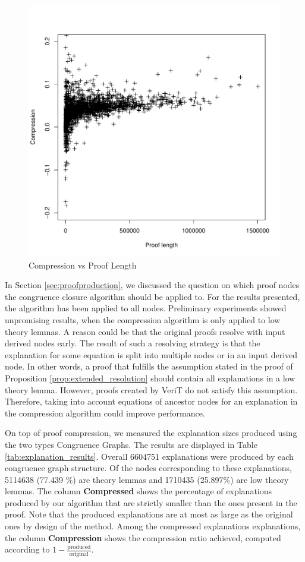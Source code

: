 \begin{figure}[h]
	\centering
	\includegraphics[scale=0.8]{figures/compression_vs_length.pdf}
	\caption{Compression vs Proof Length}
	\label{fig:congruence_compression}
\end{figure}

In Section \ref{sec:proofproduction}, we discussed the question on which proof nodes the congruence closure algorithm should be applied to.
For the results presented, the algorithm has been applied to all nodes.
Preliminary experiments showed unpromising results, when the compression algorithm is only applied to low theory lemmas.
A reason could be that the original proofs resolve with input derived nodes early.
The result of such a resolving strategy is that the explanation for some equation is split into multiple nodes or in an input derived node.
In other words, a proof that fulfills the assumption stated in the proof of Proposition \ref{prop:extended_resolution} should contain all explanations in a low theory lemma.
However, proofs created by VeriT do not satisfy this assumption.
Therefore, taking into account equations of ancestor nodes for an explanation in the compression algorithm could improve performance.

On top of proof compression, we measured the explanation sizes produced using the two types Congruence Graphs.
The results are displayed in Table \ref{tab:explanation_results}.
Overall 6604751 explanations were produced by each congruence graph structure.
Of the nodes corresponding to these explanations, 5114638 (77.439 \%) are theory lemmas and 1710435 (25.897\%) are low theory lemmas.
The column \textbf{Compressed} shows the percentage of explanations produced by our algorithm that are strictly smaller than the ones present in the proof.
Note that the produced explanations are at most as large as the original ones by design of the method.
Among the compressed explanations explanations, the column \textbf{Compression} shows the compression ratio achieved, computed according to $1 - \frac{\text{produced}}{\text{original}}$.

